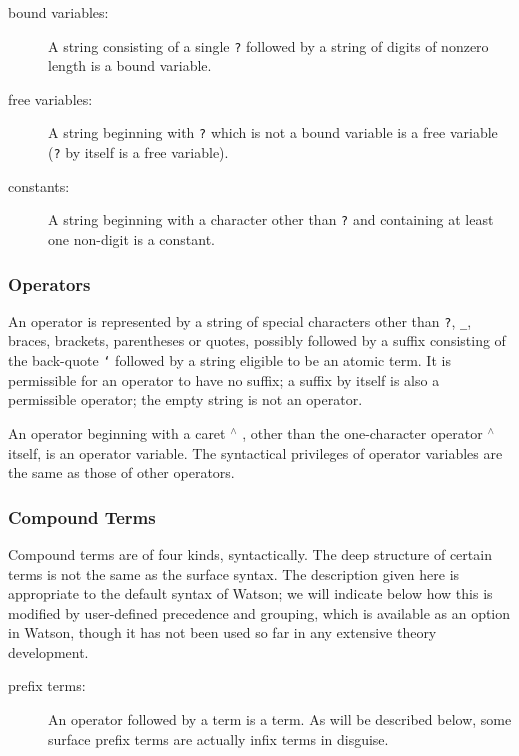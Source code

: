 \documentclass{kluwer}
\begin{document}
\begin{article}
\begin{description}
\item [bound variables:] A string consisting of a single {\tt ?} 
followed by a string of digits of nonzero length is a bound variable.

\item [free variables:] A string beginning with {\tt ?} which is not a
bound variable is a free variable ({\tt ?} by itself is a free
variable). 

\item [constants:] A string beginning with a character other than {\tt ?} and
containing at least one non-digit is a constant.

\end{description} 

\subsubsection{Operators}

An operator is represented by a string of special characters other
than {\tt ?}, {\tt \_}, braces, brackets, parentheses or quotes,
possibly followed by a suffix consisting of the back-quote {\tt `}
followed by a string eligible to be an atomic term.  It is permissible
for an operator to have no suffix; a suffix by itself is also a
permissible operator; the empty string is not an operator.

An operator beginning with a caret $^{\wedge}$ , other than the
one-character operator $^{\wedge}$ itself, is an operator variable.
The syntactical privileges of operator variables are the same as those
of other operators.

\subsubsection{Compound Terms}

Compound terms are of four kinds, syntactically.  The deep structure
of certain terms is not the same as the surface syntax.  The
description given here is appropriate to the default syntax of Watson;
we will indicate below how this is modified by user-defined precedence
and grouping, which is available as an option in Watson, though it has
not been used so far in any extensive theory development.

\begin{description}

\item[prefix terms:]  
An operator followed by a term is a term.  As will be described below,
some surface prefix terms are
actually infix terms in disguise.


\end{description}
\end{article}
\end{document}
